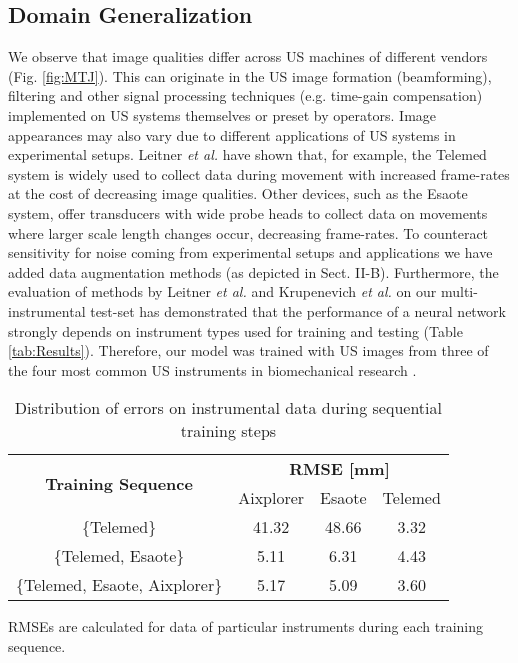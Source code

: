 \documentclass[journal,twoside,web]{ieeecolor}
\begin{document}
\subsection*{Domain Generalization}
\label{sec:generalization}
We observe that image qualities differ across US machines of different vendors (Fig. \ref{fig:MTJ}). This can originate in the US image formation (beamforming), filtering and other signal processing techniques (e.g. time-gain compensation) implemented on US systems themselves or preset by operators. Image appearances may also vary due to different applications of US systems in experimental setups. Leitner \textit{et al.} \cite{j:Leitner2019} have shown that, for example, the Telemed system is widely used to collect data during movement with increased frame-rates at the cost of decreasing image qualities. Other devices, such as the Esaote system, offer transducers with wide probe heads to collect data on movements where larger scale length changes occur, decreasing frame-rates. To counteract sensitivity for noise coming from experimental setups and applications we have added data augmentation methods (as
depicted in Sect. II-B). Furthermore, the evaluation of methods by Leitner \textit{et al.} \cite{c:LeitnerJarolim2020} and Krupenevich \textit{et al.} \cite{j:Krupenevich2021} on our multi-instrumental test-set has demonstrated that the performance of a neural network strongly depends on instrument types used for training and testing (Table \ref{tab:Results}). Therefore, our model was trained with US images from three of the four most common US instruments in biomechanical research \cite{j:Leitner2019, j:Hooren2020}. 
\setlength{\tabcolsep}{0.32em}
\begin{table}[!ht]
\caption{Distribution of errors on instrumental data during sequential training steps}
\label{tab:results_Inst}
    \vspace{-0.2cm} 
    \renewcommand{\arraystretch}{1.20}
    \begin{center}
    \begin{tabular}{cccc}
\toprule
        \multirow{2}{*}{\textbf{Training Sequence}}
        &\multicolumn{3}{c}{\textbf{RMSE [mm]}}\\
&Aixplorer
        &Esaote
        &Telemed\\ 
\midrule
        \rule{0pt}{12pt}\{Telemed\}
        &41.32
        &48.66
        &3.32\\
\rule{0pt}{12pt}\{Telemed, Esaote\}
        &5.11
        &6.31
        &4.43\\
\rule{0pt}{12pt}\{Telemed, Esaote, Aixplorer\}
        &5.17
        &5.09
        &3.60\\
\bottomrule
    \end{tabular}
    \end{center}
        \begin{tablenotes}
        \item  RMSEs are calculated for data of particular instruments during each training sequence.\\
    \end{tablenotes}
\vspace{-0.3cm}
\end{table} 
\end{document}
